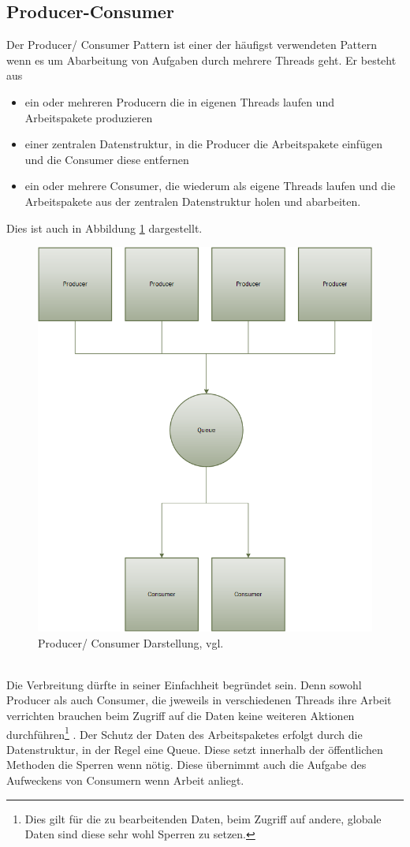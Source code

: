 \subsection{Producer-Consumer}\label{sec:producerconsumer}
Der Producer/ Consumer Pattern ist einer der häufigst verwendeten Pattern wenn es um Abarbeitung von Aufgaben durch mehrere Threads geht. Er besteht aus 
\begin{itemize}
	\item ein oder mehreren Producern die in eigenen Threads laufen und Arbeitspakete produzieren
	\item einer zentralen Datenstruktur, in die Producer die Arbeitspakete einfügen und die Consumer diese entfernen
	\item ein oder mehrere Consumer, die wiederum als eigene Threads laufen und die Arbeitspakete aus der zentralen Datenstruktur holen und abarbeiten.
\end{itemize}
Dies ist auch in Abbildung \ref{fig:architecture} dargestellt.\parencite{jthreads}
\begin{figure}
	\centering
	\includegraphics[width=0.7\linewidth]{images/B2_Producer_Consumer_1}
	\caption{Producer/ Consumer Darstellung, vgl. \parencite[S. 163]{jthreads}}
	\label{fig:architecture}
\end{figure}
\\Die Verbreitung dürfte in seiner Einfachheit begründet sein. Denn sowohl Producer als auch Consumer, die jweweils in verschiedenen Threads ihre Arbeit verrichten brauchen beim Zugriff auf die Daten keine weiteren Aktionen durchführen\footnote{Dies gilt für die zu bearbeitenden Daten, beim Zugriff auf andere, globale Daten sind diese sehr wohl Sperren zu setzen.} \parencite[S. 163ff]{jthreads}. Der Schutz der Daten des Arbeitspaketes erfolgt durch die Datenstruktur, in der Regel eine Queue. Diese setzt innerhalb der öffentlichen Methoden die Sperren wenn nötig. Diese übernimmt auch die Aufgabe des Aufweckens von Consumern wenn Arbeit anliegt.
